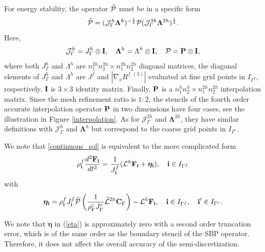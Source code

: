 For energy stability, the operator $ \widetilde{\mathcal{P}}$ must be in a specific form
\[\widetilde{\mathcal{P}} = (\mathcal{J}^h_\Gamma \bm{\Lambda}^h)^{-\frac{1}{2}}\mathcal{P}(\mathcal{J}^{2h}_\Gamma \bm{\Lambda}^{2h})^{\frac{1}{2}}.\]
Here, 
\[\mathcal{J}_{\Gamma}^h = J^{h}_{\Gamma} \otimes {\bf I},\quad {\bm{\Lambda}^h} = \Lambda^h\otimes {\bf I},\quad \mathcal{P} = {\bf P}\otimes {\bf I},\]
where both $J_{\Gamma}^h$ and $\Lambda^h$ are $n_1^{2h}n_2^{2h}\times n_1^{2h}n_2^{2h}$ diagonal matrices, the diagonal elements of $J_{\Gamma}^h$ and $\Lambda^{h}$ are $J^f$ and $|\nabla_x R^{f,(3)}|$ evaluated at fine grid points in $I_{\Gamma^f}$, respectively. ${\bf I}$ is $3\times 3$ identity matrix. Finally, ${\bf P}$ is a $n_1^hn_2^h\times n_1^{2h}n_2^{2h}$ interpolation matrix. Since the mesh refinement ratio is $1:2$, the stencils of the fourth order accurate interpolation operator ${\bf P}$ in two dimensions have four cases, see the illustration in  Figure \ref{interpolation}. As for $\mathcal{J}_{\Gamma}^{2h}$ and ${\bm{\Lambda}^{2h}}$, they have similar definitions with $\mathcal{J}_{\Gamma}^{h}$ and ${\bm{\Lambda}^{h}}$ but correspond to the coarse grid points in $I_{\Gamma^c}$.

We note that \eqref{continuous_sol} is equivalent to the more complicated form
\begin{equation}\label{elastic_semi_f_i}
{\rho}^f_{\bf i} \frac{d^2{\bf F}_{\bf i}}{dt^2} =
\frac{1}{J^f_{\bf i}}(\mathcal{L}^h{\bf F}_{\bf i} + {\bm \eta}_{\bf i}), \quad {\bf i}\in I_{\Gamma^f}
\end{equation}
with 
\begin{equation}\label{eta}
{\bm \eta}_{\bf i} = {\rho}^f_{\bf i}J^f_{\bf i}\wt{\mathcal{P}}\left(\frac{1}{\rho^c_{{\bf i}'}J^c_{{\bf i}'}}\wt{\mathcal{L}}^{2h} {\bf C}_{{\bf i}'}\right) - \mathcal{L}^{h}{\bf F}_{\bf i}, \quad {\bf i}\in I_{\Gamma^f},\quad {{\bf i}'}\in I_{\Gamma^c}.
\end{equation}

 We note that $\bm \eta$ in (\ref{eta}) is approximately zero with a second order truncation error, which is of the same order as the boundary stencil of the SBP operator. Therefore, it does not affect the overall accuracy of the semi-discretization. 

